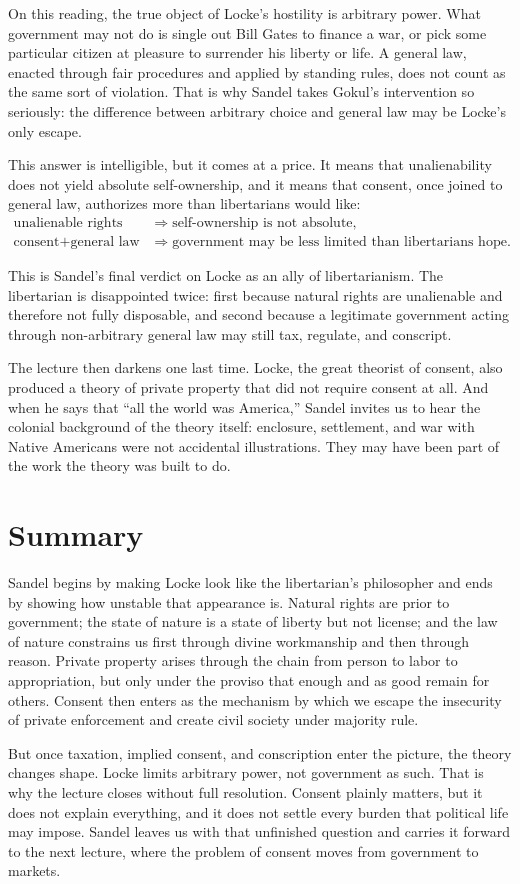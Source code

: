 On this reading, the true object of Locke's hostility is arbitrary power. What government may not do is single out Bill Gates to finance a war, or pick some particular citizen at pleasure to surrender his liberty or life. A general law, enacted through fair procedures and applied by standing rules, does not count as the same sort of violation. That is why Sandel takes Gokul's intervention so seriously: the difference between arbitrary choice and general law may be Locke's only escape.

This answer is intelligible, but it comes at a price. It means that unalienability does not yield absolute self-ownership, and it means that consent, once joined to general law, authorizes more than libertarians would like:
\begin{align}
\text{unalienable rights} &\Longrightarrow \text{self-ownership is not absolute},\\
\text{consent}+\text{general law} &\Longrightarrow \text{government may be less limited than libertarians hope}.
\end{align}

This is Sandel's final verdict on Locke as an ally of libertarianism. The libertarian is disappointed twice: first because natural rights are unalienable and therefore not fully disposable, and second because a legitimate government acting through non-arbitrary general law may still tax, regulate, and conscript.

The lecture then darkens one last time. Locke, the great theorist of consent, also produced a theory of private property that did not require consent at all. And when he says that ``all the world was America,'' Sandel invites us to hear the colonial background of the theory itself: enclosure, settlement, and war with Native Americans were not accidental illustrations. They may have been part of the work the theory was built to do.

\section{Summary}

Sandel begins by making Locke look like the libertarian's philosopher and ends by showing how unstable that appearance is. Natural rights are prior to government; the state of nature is a state of liberty but not license; and the law of nature constrains us first through divine workmanship and then through reason. Private property arises through the chain from person to labor to appropriation, but only under the proviso that enough and as good remain for others. Consent then enters as the mechanism by which we escape the insecurity of private enforcement and create civil society under majority rule.

But once taxation, implied consent, and conscription enter the picture, the theory changes shape. Locke limits arbitrary power, not government as such. That is why the lecture closes without full resolution. Consent plainly matters, but it does not explain everything, and it does not settle every burden that political life may impose. Sandel leaves us with that unfinished question and carries it forward to the next lecture, where the problem of consent moves from government to markets.